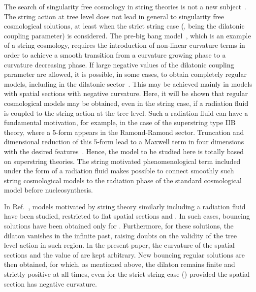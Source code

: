 \documentclass[a4paper,aps,twocolumn,prd,showpacs,nofootinbib]{revtex4}
\begin{document}
The search of singularity free cosmology in string theories is not a
new subject~\cite{lidsey,vasquez,picco,kirill,branden}. The string
action at tree level does not lead in general to singularity free
cosmological solutions, at least when the strict string case (\coordHE{}, \myHighlight{$\omega$}\coordHE{} being the dilatonic coupling parameter) is
considered. The pre-big bang model~\cite{gasperini}, which is an
example of a string cosmology, requires the introduction of non-linear
curvature terms in order to achieve a smooth transition from a
curvature growing phase to a curvature decreasing phase. If large
negative values of the dilatonic coupling parameter \myHighlight{$\omega$}\coordHE{} are
allowed, it is possible, in some cases, to obtain completely regular
models, including in the dilatonic sector~\cite{kirill}. This may be
achieved mainly in models with spatial sections with negative
curvature.  Here, it will be shown that regular cosmological models
may be obtained, even in the string case, if a radiation fluid is
coupled to the string action at the tree level. Such a radiation fluid
can have a fundamental motivation, for example, in the case of the
superstring type IIB theory, where a 5-form appears in the
Ramond-Ramond sector. Truncation and dimensional reduction of this
5-form lead to a Maxwell term in four dimensions with the desired
features~\cite{fabris}. Hence, the model to be studied here is totally
based on superstring theories.  The string motivated phenomenological
term included under the form of a radiation fluid makes possible to
connect smoothly such string cosmological models to the radiation
phase of the standard cosmological model before nucleosynthesis.

In Ref.~\cite{picco}, models motivated by string theory similarly
including a radiation fluid have been studied, restricted to flat
spatial sections and \coordHE{}.  In such cases, bouncing
solutions have been obtained only for \coordHE{}. Furthermore,
for these solutions, the dilaton vanishes in the infinite past,
raising doubts on the validity of the tree level action in such
region. In the present paper, the curvature of the spatial sections
and the value of \myHighlight{$\omega$}\coordHE{} are kept arbitrary.  New bouncing regular
solutions are then obtained, for which, as mentioned above, the
dilaton remains finite and strictly positive at all times, even for
the strict string case (\coordHE{}) provided the spatial section
has negative curvature.
\end{document}
